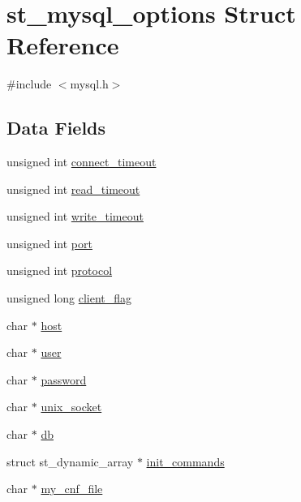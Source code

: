 \hypertarget{structst__mysql__options}{}\section{st\+\_\+mysql\+\_\+options Struct Reference}
\label{structst__mysql__options}


{\ttfamily \#include $<$mysql.\+h$>$}

\subsection*{Data Fields}
\begin{DoxyCompactItemize}
\item 
unsigned int \hyperlink{structst__mysql__options_aa8475fa207a033461041fbfd868fe3c6}{connect\+\_\+timeout}
\item 
unsigned int \hyperlink{structst__mysql__options_a6fbcc8e03aa4c489bfa23de7f4e0d8f8}{read\+\_\+timeout}
\item 
unsigned int \hyperlink{structst__mysql__options_a8956fca97f0263e415546f5624a614d2}{write\+\_\+timeout}
\item 
unsigned int \hyperlink{structst__mysql__options_a1403738b86df8bc7056a33b50bd8aff5}{port}
\item 
unsigned int \hyperlink{structst__mysql__options_a85283d4471c23b3773ca0c4c01ffb1f7}{protocol}
\item 
unsigned long \hyperlink{structst__mysql__options_a92c47dfe1c8de03a65b81863a88c9355}{client\+\_\+flag}
\item 
char $\ast$ \hyperlink{structst__mysql__options_a79fc433d16a9cd4b913a6490fc612bf3}{host}
\item 
char $\ast$ \hyperlink{structst__mysql__options_a9889ada2bcc6e077b8ee984a9c7be6e1}{user}
\item 
char $\ast$ \hyperlink{structst__mysql__options_a76f9c11ae054459cabfc89d30928b786}{password}
\item 
char $\ast$ \hyperlink{structst__mysql__options_a6d4f1507ec3907eda109548da49ee850}{unix\+\_\+socket}
\item 
char $\ast$ \hyperlink{structst__mysql__options_a82f5dcf8b83007fafa33a45583f87ce8}{db}
\item 
struct st\+\_\+dynamic\+\_\+array $\ast$ \hyperlink{structst__mysql__options_a6f9eb2e4acb59618e0843bb3c63f58f4}{init\+\_\+commands}
\item 
char $\ast$ \hyperlink{structst__mysql__options_a4cc1dad4e2d110efa24865a636613b6e}{my\+\_\+cnf\+\_\+file}

\end{DoxyCompactItemize}

